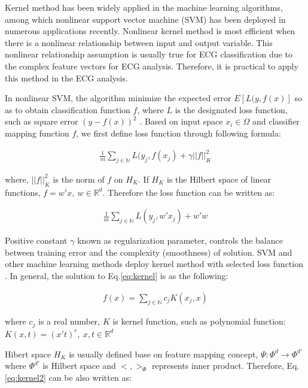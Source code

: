 Kernel method has been widely applied in the machine learning algorithms, among which nonlinear support vector machine (SVM) has been deployed in numerous applications recently\cite{shawe2004kernel}. Nonlinear kernel method is most efficient when there is a nonlinear relationship between input and output variable. This nonlinear relationship assumption is usually true for ECG classification due to the complex feature vectors for ECG analysis. Therefore, it is practical to apply this method in the ECG analysis.


In nonlinear SVM, the algorithm  minimize the expected error $E[L(y,f(x)]$ so as to obtain classification function $f$, where $L$ is the designated loss function, such as square error $(y-f(x))^2$ \cite{scholkopf1999advances}. Based on input space $x_i\in \Omega$ and classifier mapping function $f$, we first define loss function through following formula:

\begin{align}
    \frac{1}{m}\sum_{j\in \mathbb{N}}L(y_j,f(x_j) + \gamma||f||_K^2
\end{align}

where, $||f||_K^2$ is the norm of $f$ on $H_K$. If $H_K$ is the Hilbert space of linear functions, $f=w' x,~w\in\mathbb{R}^d$. Therefore the loss function can be written as:

\begin{align}
    \frac{1}{m}\sum_{j\in \mathbb{N}}L(y_j,w'x_j) + w'w
    \label{eq:kernel}
\end{align}

Positive constant $\gamma$ known as regularization parameter, controls the balance between training error and the complexity (smoothness) of solution. SVM and other machine learning methods deploy kernel method with selected loss function \cite{evgeniou2000regularization}. In general, the solution to Eq.\ref{eq:kernel} is as the following: 

\begin{align}
    f(x)=\sum_{j\in \mathbb{N}}c_j K(x_j,x)
    \label{eq:kernel2}
\end{align}

where $c_j$ is a real number, $K$ is kernel function, such as polynomial function: $K(x,t)=(x't)^r,~x,t\in \mathbb{R}^d$

Hibert space $H_K$ is usually defined base on feature mapping concept, $\Psi:\Phi^d\to \Phi^{d'}$ where $\Phi^{d'}$ is Hilbert space and $<,>_{\Phi}$  represents inner product. Therefore, Eq.\ref{eq:kernel2} can be also written as:

